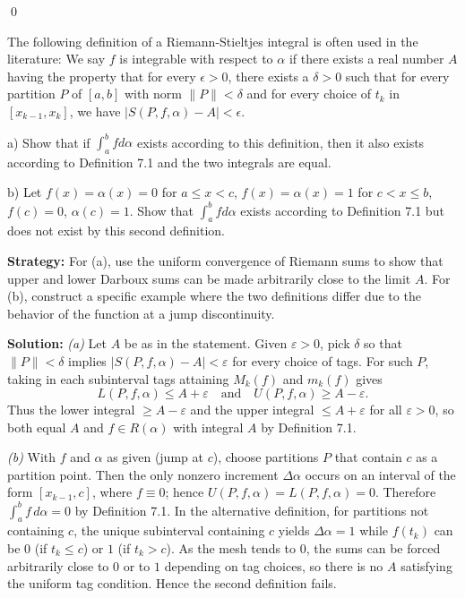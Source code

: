 \qed
\begin{problembox}
\begin{problemstatement}
The following definition of a Riemann-Stieltjes integral is often used in the literature: We say $f$ is integrable with respect to $\alpha$ if there exists a real number $A$ having the property that for every $\epsilon > 0$, there exists a $\delta > 0$ such that for every partition $P$ of $[a, b]$ with norm $\|P\| < \delta$ and for every choice of $t_k$ in $[x_{k-1}, x_k]$, we have $|S(P, f, \alpha) - A| < \epsilon$.

a) Show that if $\int_a^b f d\alpha$ exists according to this definition, then it also exists according to Definition 7.1 and the two integrals are equal.

b) Let $f(x) = \alpha(x) = 0$ for $a \leq x < c$, $f(x) = \alpha(x) = 1$ for $c < x \leq b$, $f(c) = 0$, $\alpha(c) = 1$. Show that $\int_a^b f d\alpha$ exists according to Definition 7.1 but does not exist by this second definition.
\end{problemstatement}
\end{problembox}

\noindent\textbf{Strategy:} For (a), use the uniform convergence of Riemann sums to show that upper and lower Darboux sums can be made arbitrarily close to the limit $A$. For (b), construct a specific example where the two definitions differ due to the behavior of the function at a jump discontinuity.

\bigskip\noindent\textbf{Solution:}
\textit{(a)} Let $A$ be as in the statement. Given $\varepsilon>0$, pick $\delta$ so that $\|P\|<\delta$ implies $|S(P,f,\alpha)-A|<\varepsilon$ for every choice of tags. For such $P$, taking in each subinterval tags attaining $M_k(f)$ and $m_k(f)$ gives
\[L(P,f,\alpha)\le A+\varepsilon\quad\text{and}\quad U(P,f,\alpha)\ge A-\varepsilon.
\]
Thus the lower integral $\ge A-\varepsilon$ and the upper integral $\le A+\varepsilon$ for all $\varepsilon>0$, so both equal $A$ and $f\in R(\alpha)$ with integral $A$ by Definition 7.1.

\textit{(b)} With $f$ and $\alpha$ as given (jump at $c$), choose partitions $P$ that contain $c$ as a partition point. Then the only nonzero increment $\Delta\alpha$ occurs on an interval of the form $[x_{k-1},c]$, where $f\equiv 0$; hence $U(P,f,\alpha)=L(P,f,\alpha)=0$. Therefore $\int_a^b f\,d\alpha=0$ by Definition 7.1. In the alternative definition, for partitions not containing $c$, the unique subinterval containing $c$ yields $\Delta\alpha=1$ while $f(t_k)$ can be $0$ (if $t_k\le c$) or $1$ (if $t_k>c$). As the mesh tends to $0$, the sums can be forced arbitrarily close to $0$ or to $1$ depending on tag choices, so there is no $A$ satisfying the uniform tag condition. Hence the second definition fails.




